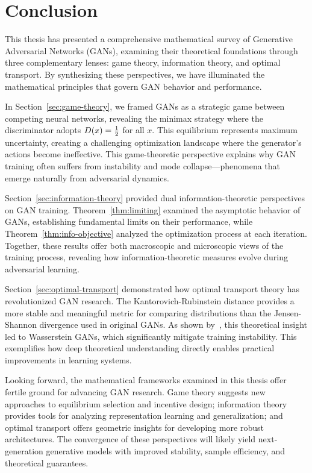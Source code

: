 \section{Conclusion}
This thesis has presented a comprehensive mathematical survey of Generative Adversarial Networks (GANs), examining their theoretical foundations through three complementary lenses: game theory, information theory, and optimal transport. By synthesizing these perspectives, we have illuminated the mathematical principles that govern GAN behavior and performance.

In Section~\ref{sec:game-theory}, we framed GANs as a strategic game between competing neural networks, revealing the minimax strategy where the discriminator adopts $D(x) = {1 \over 2}$ for all $x$. This equilibrium represents maximum uncertainty, creating a challenging optimization landscape where the generator's actions become ineffective. This game-theoretic perspective explains why GAN training often suffers from instability and mode collapse—phenomena that emerge naturally from adversarial dynamics.

Section~\ref{sec:information-theory} provided dual information-theoretic perspectives on GAN training. Theorem~\ref{thm:limiting} examined the asymptotic behavior of GANs, establishing fundamental limits on their performance, while Theorem~\ref{thm:info-objective} analyzed the optimization process at each iteration. Together, these results offer both macroscopic and microscopic views of the training process, revealing how information-theoretic measures evolve during adversarial learning.

Section~\ref{sec:optimal-transport} demonstrated how optimal transport theory has revolutionized GAN research. The Kantorovich-Rubinstein distance provides a more stable and meaningful metric for comparing distributions than the Jensen-Shannon divergence used in original GANs. As shown by~\cite{ref:arjovsky-2017}, this theoretical insight led to Wasserstein GANs, which significantly mitigate training instability. This exemplifies how deep theoretical understanding directly enables practical improvements in learning systems.

Looking forward, the mathematical frameworks examined in this thesis offer fertile ground for advancing GAN research. Game theory suggests new approaches to equilibrium selection and incentive design; information theory provides tools for analyzing representation learning and generalization; and optimal transport offers geometric insights for developing more robust architectures. The convergence of these perspectives will likely yield next-generation generative models with improved stability, sample efficiency, and theoretical guarantees.


